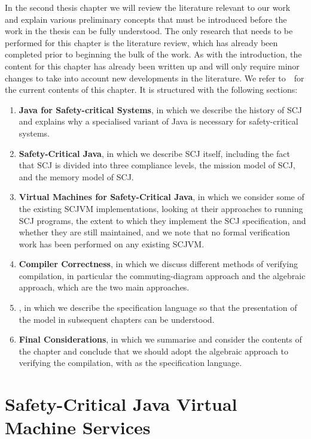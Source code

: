 \documentclass[a4paper,10pt]{report}
\let\olditem\item
\renewcommand{\item}[1][]{\olditem{\bfseries #1}}
\begin{document}
In the second thesis chapter we will review the literature relevant to
our work and explain various preliminary concepts that must be
introduced before the work in the thesis can be fully understood.
The only research that needs to be performed for this chapter is the
literature review, which has already been completed prior to beginning
the bulk of the work.
As with the introduction, the content for this chapter has already
been written up and will only require minor changes to take into
account new developments in the literature.
We refer to~\cite{baxter2016draftthesis}~for the current contents of
this chapter.
It is structured with the following sections:
\begin{enumerate}
\item[Java for Safety-critical Systems], in which we describe the
  history of SCJ and explains why a specialised variant of Java is
  necessary for safety-critical systems.
\item[Safety-Critical Java], in which we describe SCJ itself, including the
  fact that SCJ is divided into three compliance levels, the mission
  model of SCJ, and the memory model of SCJ.
\item[Virtual Machines for Safety-Critical Java], in which we consider
  some of the existing SCJVM implementations, looking at their
  approaches to running SCJ programs, the extent to which they
  implement the SCJ specification, and whether they are still
  maintained, and we note that no formal verification work has
  been performed on any existing SCJVM.
\item[Compiler Correctness], in which we discuss different methods of
  verifying compilation, in particular the commuting-diagram approach
  and the algebraic approach, which are the two main approaches.
\item[\Circus{}], in which we describe the \Circus{} specification
  language so that the presentation of the model in subsequent
  chapters can be understood.
\item[Final Considerations], in which we summarise and consider the
  contents of the chapter and conclude that we should adopt the
  algebraic approach to verifying the compilation, with \Circus{} as
  the specification language.
\end{enumerate}

\section{Safety-Critical Java Virtual Machine Services}
\end{document}
